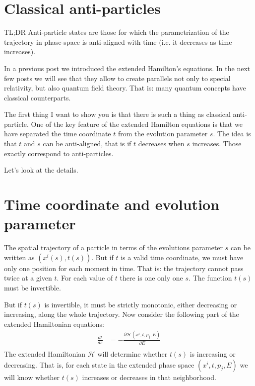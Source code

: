 \documentclass[aps,pra,10pt,floatfix,nofootinbib]{revtex4-1}
\theoremstyle{definition}
\begin{document}
\section{Classical anti-particles}

TL;DR Anti-particle states are those for which the parametrization of the trajectory in phase-space is anti-aligned with time (i.e. it decreases as time increases).

In a previous post we introduced the extended Hamilton's equations. In the next few posts we will see that they allow to create parallels not only to special relativity, but also quantum field theory. That is: many quantum concepts have classical counterparts.

The first thing I want to show you is that there is such a thing as classical anti-particle. One of the key feature of the extended Hamilton equations is that we have separated the time coordinate $t$ from the evolution parameter $s$. The idea is that $t$ and $s$ can be anti-aligned, that is if $t$ decreases when $s$ increases. Those exactly correspond to anti-particles.

Let's look at the details.

\section{Time coordinate and evolution parameter}

The spatial trajectory of a particle in terms of the evolutions parameter $s$ can be written as $(x^i(s), t(s))$. But if $t$ is a valid time coordinate, we must have only one position for each moment in time. That is: the trajectory cannot pass twice at a given $t$. For each value of $t$ there is one only one $s$. The function $t(s)$ must be invertible.

But if $t(s)$ is invertible, it must be strictly monotonic, either decreasing or increasing, along the whole trajectory. Now consider the following part of the extended Hamiltonian equations:
\begin{equation}
\begin{aligned}
\frac{dt}{ds} &= - \frac{\partial \mathcal{H}(x^i,t,p_j,E)}{\partial E} \\
\end{aligned}
\label{ExtendedHamiltonTime}
\end{equation}
The extended Hamiltonian $\mathcal{H}$ will determine whether $t(s)$ is increasing or decreasing. That is, for each state in the extended phase space $(x^i,t,p_j,E)$ we will know whether $t(s)$ increases or decreases in that neighborhood.
\end{document}
